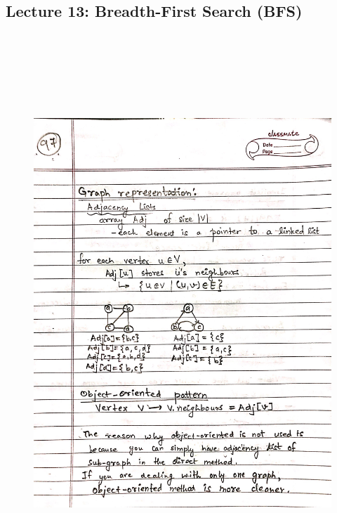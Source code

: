 \newpage
{\color{black} \subsection*{Lecture 13: Breadth-First Search (BFS)}}
\begin{figure}[H]
    \centering
    \includegraphics[width=16cm, height=21cm]{"./MIT-6.006/MIT-6006-097"}
\end{figure}

